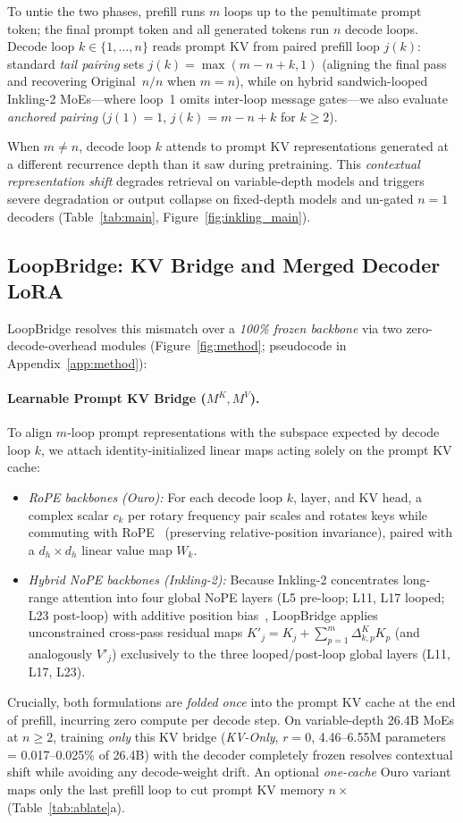 \documentclass[11pt]{article}
\begin{document}
To untie the two phases, prefill runs $m$ loops up to the penultimate prompt token; the final prompt token and all
generated tokens run $n$ decode loops. Decode loop $k\in\{1,\dots,n\}$ reads prompt KV from paired prefill loop $j(k)$:
standard \emph{tail pairing} sets $j(k){=}\max(m{-}n{+}k,1)$ (aligning the final pass and recovering Original~$n/n$ when
$m{=}n$), while on hybrid sandwich-looped Inkling-2 MoEs---where loop~1 omits inter-loop message gates---we also evaluate
\emph{anchored pairing} ($j(1){=}1$, $j(k){=}m{-}n{+}k$ for $k{\ge}2$).

When $m{\neq}n$, decode loop $k$ attends to prompt KV representations generated at a different recurrence depth than it
saw during pretraining. This \emph{contextual representation shift} degrades retrieval on variable-depth models and
triggers severe degradation or output collapse on fixed-depth models and un-gated $n{=}1$ decoders
(Table~\ref{tab:main}, Figure~\ref{fig:inkling_main}).

\subsection{LoopBridge: KV Bridge and Merged Decoder LoRA}

LoopBridge resolves this mismatch over a \emph{100\% frozen backbone} via two zero-decode-overhead modules
(Figure~\ref{fig:method}; pseudocode in Appendix~\ref{app:method}):

\paragraph{Learnable Prompt KV Bridge ($M^K, M^V$).}
To align $m$-loop prompt representations with the subspace expected by decode loop $k$, we attach identity-initialized
linear maps acting solely on the prompt KV cache:
\begin{itemize}
\item \emph{RoPE backbones (Ouro):} For each decode loop $k$, layer, and KV head, a complex scalar $c_k$ per rotary
frequency pair scales and rotates keys while commuting with RoPE~\citep{rope} (preserving relative-position invariance),
paired with a $d_h{\times}d_h$ linear value map $W_k$.
\item \emph{Hybrid NoPE backbones (Inkling-2):} Because Inkling-2 concentrates long-range attention into four global
NoPE layers (L5 pre-loop; L11, L17 looped; L23 post-loop) with additive position bias~\citep{inkling2}, LoopBridge
applies unconstrained cross-pass residual maps $K'_j = K_j + \sum_{p=1}^m \Delta^K_{k,p} K_p$ (and analogously $V'_j$)
exclusively to the three looped/post-loop global layers (L11, L17, L23).
\end{itemize}
Crucially, both formulations are \emph{folded once} into the prompt KV cache at the end of prefill, incurring zero
compute per decode step. On variable-depth 26.4B MoEs at $n{\ge}2$, training \emph{only} this KV bridge (\emph{KV-Only},
$r{=}0$, 4.46--6.55M parameters = 0.017--0.025\% of 26.4B) with the decoder completely frozen resolves contextual shift
while avoiding any decode-weight drift. An optional \emph{one-cache} Ouro variant maps only the last prefill loop to cut
prompt KV memory $n\times$ (Table~\ref{tab:ablate}a).
\end{document}
